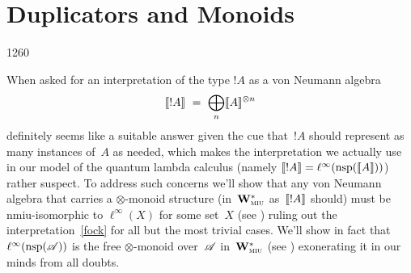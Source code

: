 \section{Duplicators and Monoids}
\label{S:duplicable}
\begin{parsec}{1260}%
\begin{point}{10}%
When asked for an
interpretation of the type $!A$
as a von Neumann algebra
\begin{equation}
\label{fock}
\sem{!A}
\ = \ 
\bigoplus_n \sem{A}^{\otimes n}
\end{equation}
definitely seems
like a suitable answer
given
the cue that~$!A$ should represent
as many instances of~$A$ as needed,
which makes the interpretation
we actually use in our model of the quantum lambda calculus
(namely $\llbracket!A\rrbracket=\ell^\infty(\mathrm{nsp}(\llbracket A\rrbracket))$)
rather
suspect.
To address such concerns
we'll show that any von Neumann algebra
that carries a $\otimes$-monoid structure
(in~$\mathbf{W}^*_{\text{\textsc{miu}}}$ as~$\llbracket!A\rrbracket$ should)
must be nmiu-isomorphic
to $\ell^\infty(X)$ for some set~$X$
(see )
ruling out the interpretation~\eqref{fock}
for all but the most trivial cases.
We'll show in fact that~$\ell^\infty(\mathrm{nsp}(\mathscr{A}))$
is the free $\otimes$-monoid
over~$\mathscr{A}$
in~$\mathbf{W}^*_{\text{\textsc{miu}}}$ (see )
exonerating it in our minds from all doubts.
\end{point}
\end{parsec}
